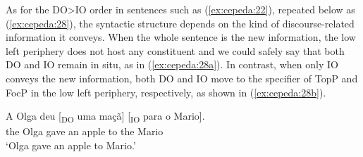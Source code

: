 \documentclass[output=paper,colorlinks,citecolor=brown,modfonts,nonflat]{langsci/langscibook}
\begin{document}
\ea%
    \label{ex:cepeda:27}
    \hspace*{-10mm}
\z

As for the DO>IO order in sentences such as (\ref{ex:cepeda:22}), repeated below as (\ref{ex:cepeda:28}), the syntactic structure depends on the kind of discourse-related information it conveys. When the whole sentence is the new information, the low left periphery does not host any constituent and we could safely say that both DO and IO remain in situ, as in (\ref{ex:cepeda:28a}). In contrast, when only IO conveys the new information, both DO and IO move to the specifier of TopP and FocP in the low left periphery, respectively, as shown in (\ref{ex:cepeda:28b}).

\ea \label{ex:cepeda:28}
	\gll A   Olga deu [\textsubscript{DO} uma maçã] [\textsubscript{IO} para o   Mario].\\
			the Olga gave \hspaceThis{[\textsubscript{DO}} an apple \hspaceThis{[\textsubscript{IO}} to the Mario\\
	\glt ‘Olga gave an apple to Mario.’
		\label{ex:cepeda:28a}
		\label{ex:cepeda:28b}
	\z
\z
\end{document}
